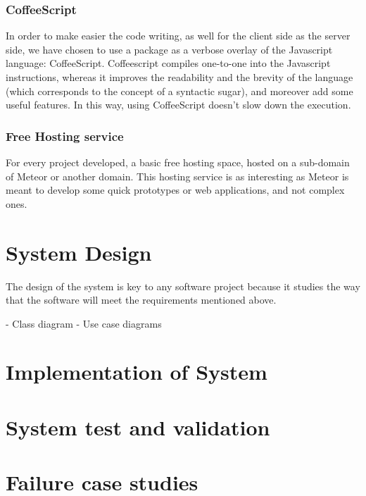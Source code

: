 \documentclass{article}
\begin{document}
\subsubsection{CoffeeScript}
In order to make easier the code writing, as well for the client side as the server side, we have chosen to use a package as a verbose overlay of the Javascript language: CoffeeScript. Coffeescript compiles one-to-one into the Javascript instructions, whereas it improves the readability and the brevity of the language (which corresponds to the concept of a syntactic sugar), and moreover add some useful features. In this way, using CoffeeScript doesn't slow down the execution.

\subsubsection{Free Hosting service}
For every project developed, a basic free hosting space, hosted on a sub-domain of Meteor or another domain. This hosting service is as interesting as Meteor is meant to develop some quick prototypes or web applications, and not complex ones.




\section{System Design}

The design of the system is key to any software project because it studies the way that the software will meet the requirements mentioned above.

- Class diagram
- Use case diagrams



\section{Implementation of System}

\section{System test and validation}

\section{Failure case studies}
\end{document}
